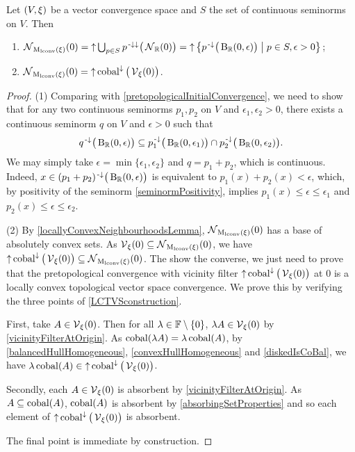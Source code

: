 \begin{proposition} \label{neighbourhoodLconvMod}
Let $\sSet{V,\xi}$ be a vector convergence space and $S$ the set of continuous seminorms on $V$. Then
\begin{enumerate}
\item $\neighbourhood_{\lconvMod(\xi)}(0) = \upset \bigcup_{p\in S} p^{\preimf\imf}\big(\neighbourhood_\R(0)\big) = \upset \setbuilder{p^{\preimf}\big(\ball_\R(0, \epsilon)\big)}{p\in S, \epsilon > 0}$;
\item $\operatorname{\mathcal{N}}_{\operatorname{M_\text{lconv}}(\xi)}(0) = \operatorname{\uparrow}\operatorname{cobal}^{\downarrow}\big(\operatorname{\mathcal{V}}_\xi(0)\big)$.
\end{enumerate}
\end{proposition}
\begin{proof}
(1) Comparing with \ref{pretopologicalInitialConvergence}, we need to show that for any two continuous seminorms $p_1, p_2$ on $V$ and $\epsilon_1,\epsilon_2 > 0$, there exists a continuous seminorm $q$ on $V$ and $\epsilon >0$ such that
\[ q^{\text{\hspace{0.15em}-}\downarrow}\big(\operatorname{B}_{\mathbb{R}}(0,\epsilon)\big) \subseteq p_1^{\text{\hspace{0.15em}-}\downarrow}\big(\operatorname{B}_{\mathbb{R}}(0,\epsilon_1)\big) \cap p_2^{\text{\hspace{0.15em}-}\downarrow}\big(\operatorname{B}_{\mathbb{R}}(0,\epsilon_2)\big). \]
We may simply take $\epsilon = \min\{\epsilon_1, \epsilon_2\}$ and $q = p_1+p_2$, which is continuous. Indeed, $x\in (p_1+p_2)^{\text{\hspace{0.15em}-}\downarrow}\big(\operatorname{B}_{\mathbb{R}}(0,\epsilon)\big)$ is equivalent to $p_1(x) + p_2(x) < \epsilon$, which, by positivity of the seminorm \ref{seminormPositivity}, implies $p_1(x)\leq \epsilon \leq \epsilon_1$ and $p_2(x)\leq \epsilon \leq \epsilon_2$.

(2) By \ref{locallyConvexNeighbourhoodsLemma}, $\operatorname{\mathcal{N}}_{\operatorname{M_\text{lconv}}(\xi)}(0)$ has a base of absolutely convex sets. As $\operatorname{\mathcal{V}}_\xi(0)\subseteq\operatorname{\mathcal{N}}_{\operatorname{M_\text{lconv}}(\xi)}(0)$, we have $\operatorname{\uparrow}\operatorname{cobal}^{\downarrow}\big(\operatorname{\mathcal{V}}_\xi(0)\big) \subseteq \operatorname{\mathcal{N}}_{\operatorname{M_\text{lconv}}(\xi)}(0)$. The show the converse, we just need to prove that the pretopological convergence with vicinity filter $\operatorname{\uparrow}\operatorname{cobal}^{\downarrow}\big(\operatorname{\mathcal{V}}_\xi(0)\big)$ at $0$ is a locally convex topological vector space convergence. We prove this by verifying the three points of \ref{LCTVSconstruction}.

First, take $A\in \operatorname{\mathcal{V}}_\xi(0)$. Then for all $\lambda\in\mathbb{F}\setminus\{0\}$, $\lambda A \in \operatorname{\mathcal{V}}_\xi(0)$ by \ref{vicinityFilterAtOrigin}. As $\operatorname{cobal}(\lambda A) = \lambda\operatorname{cobal}(A)$, by \ref{balancedHullHomogeneous}, \ref{convexHullHomogeneous} and \ref{diskedIsCoBal}, we have $\lambda \operatorname{cobal}(A)\in \operatorname{\uparrow}\operatorname{cobal}^{\downarrow}\big(\operatorname{\mathcal{V}}_\xi(0)\big)$.

Secondly, each $A\in \operatorname{\mathcal{V}}_\xi(0)$ is absorbent by \ref{vicinityFilterAtOrigin}. As $A\subseteq \operatorname{cobal}(A)$, $\operatorname{cobal}(A)$ is absorbent by \ref{absorbingSetProperties} and so each element of $\operatorname{\uparrow}\operatorname{cobal}^{\downarrow}\big(\operatorname{\mathcal{V}}_\xi(0)\big)$ is absorbent.

The final point is immediate by construction.
\end{proof}

